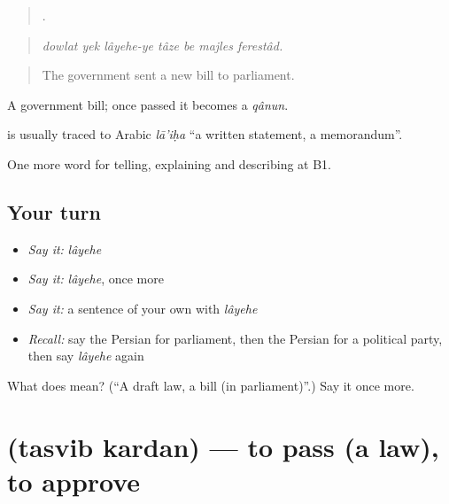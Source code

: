 \begin{quote}
      .
\end{quote}

\begin{quote}
\emph{dowlat yek lâyehe-ye tâze be majles ferestâd.}
\end{quote}

\begin{quote}
The government sent a new bill to parliament.
\end{quote}

A government bill; once passed it becomes a \emph{qânun}.

\begin{cousinweb}
\textbf{} is usually traced to Arabic \emph{lā'iḥa} \textquotedblleft{}a written statement, a memorandum\textquotedblright{}.
\end{cousinweb}

\begin{grammarlens}[title={What you've built}]
One more word for telling, explaining and describing at B1.
\end{grammarlens}

\subsection*{Your turn}
\begin{itemize}
\raggedright
  \item \emph{Say it:} \emph{lâyehe}
  \item \emph{Say it:} \emph{lâyehe}, once more
  \item \emph{Say it:} a sentence of your own with \emph{lâyehe}
  \item \emph{Recall:} say the Persian for parliament, then the Persian for a political party, then say \emph{lâyehe} again
\end{itemize}

\begin{tcolorbox}[breakable,colback=teal!4,colframe=teal!35!black,title={Before you move on}]
What does  mean? (\textquotedblleft{}A draft law, a bill (in parliament)\textquotedblright{}.) Say it once more.
\end{tcolorbox}
\section[\texorpdfstring{\fa{تصویب} \fa{کردن} (tasvib kardan)}{تصویب کردن (tasvib kardan)}]{  (tasvib kardan) — to pass (a law), to approve}

